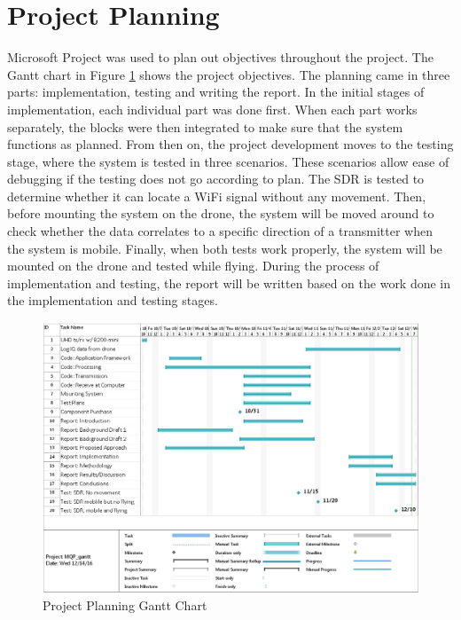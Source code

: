 \section{Project Planning}
Microsoft Project was used to plan out objectives throughout the project. The Gantt chart in Figure \ref{fig:gantt_chart} shows the project objectives. The planning came in three parts: implementation, testing and writing the report. In the initial stages of implementation, each individual part was done first. When each part works separately, the blocks were then integrated to make sure that the system functions as planned. From then on, the project development moves to the testing stage, where the system is tested in three scenarios. These scenarios allow ease of debugging if the testing does not go according to plan. The SDR is tested to determine whether it can locate a WiFi signal without any movement. Then, before mounting the system on the drone, the system will be moved around to check whether the data correlates to a specific direction of a transmitter when the system is mobile. Finally, when both tests work properly, the system will be mounted on the drone and tested while flying. During the process of implementation and testing, the report will be written based on the work done in the implementation and testing stages.
\begin{figure}[ht]
\centering
\includegraphics[width=.75\textwidth]{img/oct_gantt_chart.png}
\caption{Project Planning Gantt Chart}
\label{fig:gantt_chart}
\end{figure}
